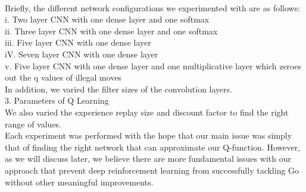 \\
Briefly, the different network configurations we experimented with are as follows:
\\
i. Two layer CNN with one dense layer and one softmax
\\
ii. Three layer CNN with one dense layer and one softmax
\\
iii. Five layer CNN with one dense layer
\\
iV. Seven layer CNN with one dense layer
\\
v. Five layer CNN with one dense layer and one multiplicative layer which zeroes out the q values of illegal moves
\\
In addition, we varied the filter sizes of the convolution layers.
\\
3. Parameters of Q Learning
\\
We also varied the experience replay size and discount factor to find the right range of values. 
\\
Each experiment was performed with the hope that our main issue was simply that of finding the right network that can approximate our Q-function. However, as we will discuss later, we believe there are more fundamental issues with our approach that prevent deep reinforcement learning from successfully tackling Go without other meaningful improvements.